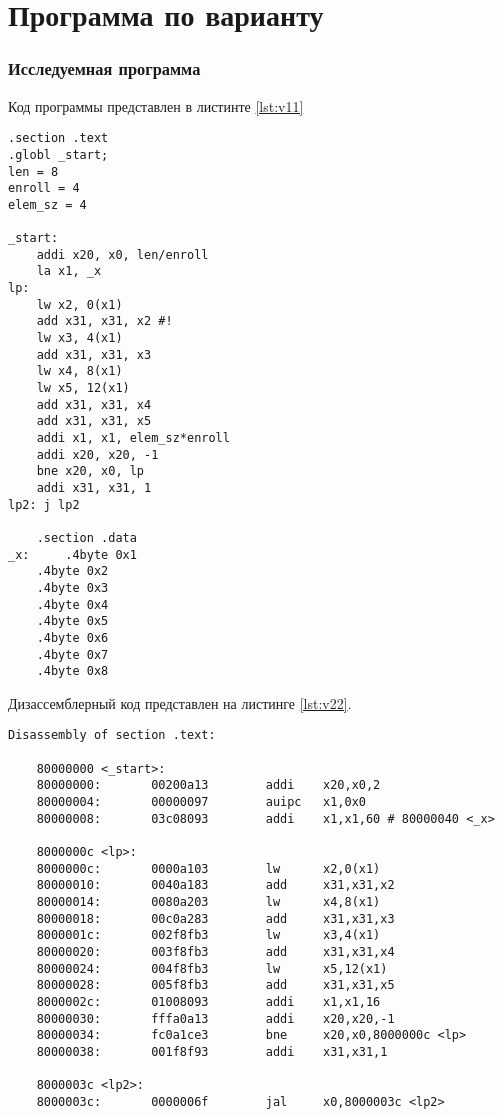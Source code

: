 \chapter*{Программа по варианту}

\subsection*{Исследуемная программа}

Код программы представлен в листинте \ref{lst:v11}

\begin{lstlisting}[label=lst:v11,caption=Код программы 9 варианта]
       .section .text
.globl _start;
len = 8 
enroll = 4
elem_sz = 4 

_start:
	addi x20, x0, len/enroll
	la x1, _x
lp:
	lw x2, 0(x1)
	add x31, x31, x2 #!
	lw x3, 4(x1)
	add x31, x31, x3
	lw x4, 8(x1)
	lw x5, 12(x1)
	add x31, x31, x4
	add x31, x31, x5
	addi x1, x1, elem_sz*enroll
	addi x20, x20, -1
	bne x20, x0, lp
	addi x31, x31, 1
lp2: j lp2

	.section .data
_x:     .4byte 0x1
	.4byte 0x2
	.4byte 0x3
	.4byte 0x4
	.4byte 0x5
	.4byte 0x6
	.4byte 0x7
	.4byte 0x8
\end{lstlisting}


Дизассемблерный код представлен на листинге \ref{lst:v22}.

\begin{lstlisting}[label=lst:v22,caption=Дизассемблированный код 9 варианта]
	Disassembly of section .text:
	
	80000000 <_start>:
	80000000:       00200a13        addi    x20,x0,2
	80000004:       00000097        auipc   x1,0x0
	80000008:       03c08093        addi    x1,x1,60 # 80000040 <_x>
	
	8000000c <lp>:
	8000000c:       0000a103        lw      x2,0(x1)
	80000010:       0040a183        add     x31,x31,x2
	80000014:       0080a203        lw      x4,8(x1)
	80000018:       00c0a283        add     x31,x31,x3
	8000001c:       002f8fb3        lw      x3,4(x1)
	80000020:       003f8fb3        add     x31,x31,x4
	80000024:       004f8fb3        lw      x5,12(x1)
	80000028:       005f8fb3        add     x31,x31,x5
	8000002c:       01008093        addi    x1,x1,16
	80000030:       fffa0a13        addi    x20,x20,-1
	80000034:       fc0a1ce3        bne     x20,x0,8000000c <lp>
	80000038:       001f8f93        addi    x31,x31,1
	
	8000003c <lp2>:
	8000003c:       0000006f        jal     x0,8000003c <lp2>
\end{lstlisting}

